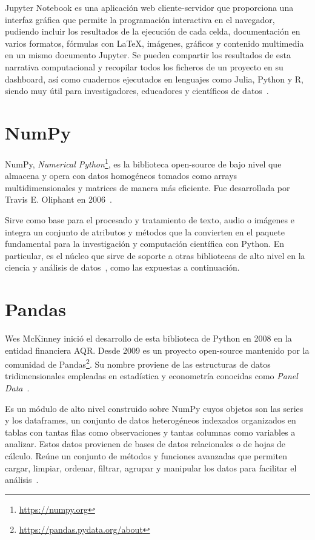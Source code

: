 \documentclass[a4paper, 12pt]{book}
\begin{document}
Jupyter Notebook es una aplicación web cliente-servidor que proporciona una interfaz gráfica que permite la programación interactiva en el navegador, pudiendo incluir los resultados de la ejecución de cada celda, documentación en varios formatos, fórmulas con LaTeX, imágenes, gráficos y contenido multimedia en un mismo documento Jupyter. Se pueden compartir los resultados de esta narrativa computacional y recopilar todos los ficheros de un proyecto en su dashboard, así como cuadernos ejecutados en lenguajes como Julia, Python y R, siendo muy útil para investigadores, educadores y científicos de datos~\cite{perez2015project}.

\section{NumPy} 
\label{sec:numpy}

NumPy, \emph{Numerical Python}\footnote{\url{https://numpy.org}}, es la biblioteca open-source de bajo nivel que almacena y opera con datos homogéneos tomados como arrays multidimensionales y matrices de manera más eficiente. Fue desarrollada por Travis E. Oliphant en 2006~\cite{oliphant2006guide}.

Sirve como base para el procesado y tratamiento de texto, audio o imágenes e integra un conjunto de atributos y métodos que la convierten en el paquete fundamental para la investigación y computación científica con Python. En particular, es el núcleo que sirve de soporte a otras bibliotecas de alto nivel en la ciencia y análisis de datos~\cite{harris2020array}, como las expuestas a continuación.

\section{Pandas} 
\label{sec:pandas}

Wes McKinney inició el desarrollo de esta biblioteca de Python en 2008 en la entidad financiera AQR. Desde 2009 es un proyecto open-source mantenido por la comunidad de Pandas\footnote{\url{https://pandas.pydata.org/about}}. Su nombre proviene de las estructuras de datos tridimensionales empleadas en estadística y econometría conocidas como \emph{Panel Data}~\cite{mckinney2011pandas}.

Es un módulo de alto nivel construido sobre NumPy cuyos objetos son las series y los dataframes, un conjunto de datos heterogéneos indexados organizados en tablas con tantas filas como observaciones y tantas columnas como variables a analizar. Estos datos provienen de bases de datos relacionales o de hojas de cálculo. Reúne un conjunto de métodos y funciones avanzadas que permiten cargar, limpiar, ordenar, filtrar, agrupar y manipular los datos para facilitar el análisis~\cite{McKinneyWes2018Pfda, VanderplasJake2017Pdsh}. %
\end{document}
